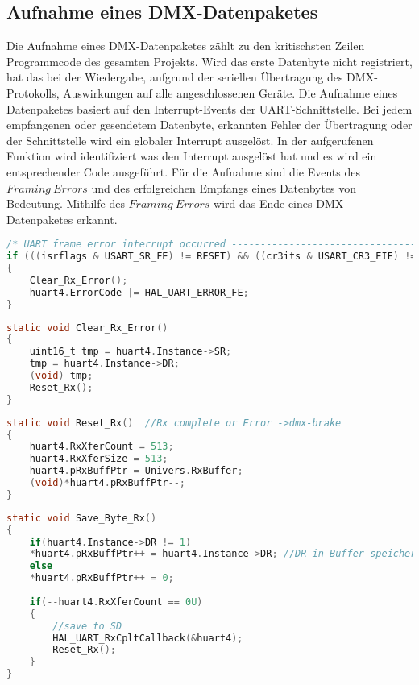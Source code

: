 
\subsection{Aufnahme eines DMX-Datenpaketes}
Die Aufnahme eines DMX-Datenpaketes zählt zu den kritischsten Zeilen Programmcode des gesamten Projekts. Wird das erste Datenbyte nicht registriert, hat das bei der Wiedergabe, aufgrund der seriellen Übertragung des DMX-Protokolls, Auswirkungen auf alle angeschlossenen Geräte. 
Die Aufnahme eines Datenpaketes basiert auf den Interrupt-Events der UART-Schnittstelle. Bei jedem empfangenen oder gesendetem Datenbyte, erkannten Fehler der Übertragung oder der Schnittstelle wird ein globaler Interrupt ausgelöst. In der aufgerufenen Funktion wird identifiziert was den Interrupt ausgelöst hat und es wird ein entsprechender Code ausgeführt. Für die Aufnahme sind die Events des $Framing\ Errors$ und des erfolgreichen Empfangs eines Datenbytes von Bedeutung. Mithilfe des $Framing\ Errors$ wird das Ende eines DMX-Datenpaketes erkannt.
\begin{lstlisting}[caption = stm32f4xx\_it.c: UART Framing Error,
	label = code:itFE, 
	language = C, 
	firstnumber = 349]
/* UART frame error interrupt occurred -----------------------------------*/
if (((isrflags & USART_SR_FE) != RESET) && ((cr3its & USART_CR3_EIE) != RESET))
{
	Clear_Rx_Error();
	huart4.ErrorCode |= HAL_UART_ERROR_FE;
}
\end{lstlisting}
\begin{lstlisting}[caption = stm32f4xx\_it.c: UART Clear\_Rx\_Error(),
	label = code:itErrorclear, 
	language = C, 
	firstnumber = 426]
static void Clear_Rx_Error()
{
	uint16_t tmp = huart4.Instance->SR;
	tmp = huart4.Instance->DR;
	(void) tmp;
	Reset_Rx();
}
\end{lstlisting}

\begin{lstlisting}[caption = stm32f4xx\_it.c: UART Reset\_Rx(),
	label = code:itResetRx, 
	language = C, 
	firstnumber = 434]
static void Reset_Rx()	//Rx complete or Error ->dmx-brake
{
	huart4.RxXferCount = 513;
	huart4.RxXferSize = 513;
	huart4.pRxBuffPtr = Univers.RxBuffer;
	(void)*huart4.pRxBuffPtr--;
}
\end{lstlisting}

\begin{lstlisting}[caption = stm32f4xx\_it.c: UART Save\_Byte\_Rx(),
	label = code:itSaveByte, 
	language = C, 
	firstnumber = 442]
static void Save_Byte_Rx()
{
	if(huart4.Instance->DR != 1)
	*huart4.pRxBuffPtr++ = huart4.Instance->DR; //DR in Buffer speichern
	else
	*huart4.pRxBuffPtr++ = 0;
	
	if(--huart4.RxXferCount == 0U)
	{
		//save to SD
		HAL_UART_RxCpltCallback(&huart4);
		Reset_Rx();
	}
}
\end{lstlisting}

